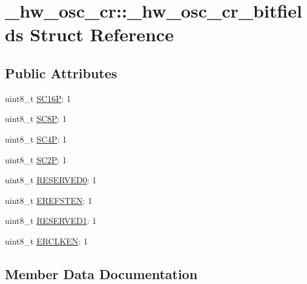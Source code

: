 \hypertarget{struct__hw__osc__cr_1_1__hw__osc__cr__bitfields}{}\section{\+\_\+hw\+\_\+osc\+\_\+cr\+:\+:\+\_\+hw\+\_\+osc\+\_\+cr\+\_\+bitfields Struct Reference}
\label{struct__hw__osc__cr_1_1__hw__osc__cr__bitfields}
\subsection*{Public Attributes}
\begin{DoxyCompactItemize}
\item 
uint8\+\_\+t \hyperlink{struct__hw__osc__cr_1_1__hw__osc__cr__bitfields_a145e5626d21938516bf81bd2fd14c99f}{S\+C16P}\+: 1
\item 
uint8\+\_\+t \hyperlink{struct__hw__osc__cr_1_1__hw__osc__cr__bitfields_ae7f40e2862e86f935c778b8eb45e3a7b}{S\+C8P}\+: 1
\item 
uint8\+\_\+t \hyperlink{struct__hw__osc__cr_1_1__hw__osc__cr__bitfields_a7756c45924be9f067eb33148291248cf}{S\+C4P}\+: 1
\item 
uint8\+\_\+t \hyperlink{struct__hw__osc__cr_1_1__hw__osc__cr__bitfields_a0aab53db06293aab68fe4820afefff61}{S\+C2P}\+: 1
\item 
uint8\+\_\+t \hyperlink{struct__hw__osc__cr_1_1__hw__osc__cr__bitfields_a23ae2b48c7e8412ef575dbb36cb76a4f}{R\+E\+S\+E\+R\+V\+E\+D0}\+: 1
\item 
uint8\+\_\+t \hyperlink{struct__hw__osc__cr_1_1__hw__osc__cr__bitfields_a31280920d43ee6f0e3ad1ec1e3d213ce}{E\+R\+E\+F\+S\+T\+EN}\+: 1
\item 
uint8\+\_\+t \hyperlink{struct__hw__osc__cr_1_1__hw__osc__cr__bitfields_a4ec6d3aa5321d8cfd5cdddd214096925}{R\+E\+S\+E\+R\+V\+E\+D1}\+: 1
\item 
uint8\+\_\+t \hyperlink{struct__hw__osc__cr_1_1__hw__osc__cr__bitfields_ac8dc1fb109bc6bb8678d0c6d141bbf92}{E\+R\+C\+L\+K\+EN}\+: 1
\end{DoxyCompactItemize}


\subsection{Member Data Documentation}
